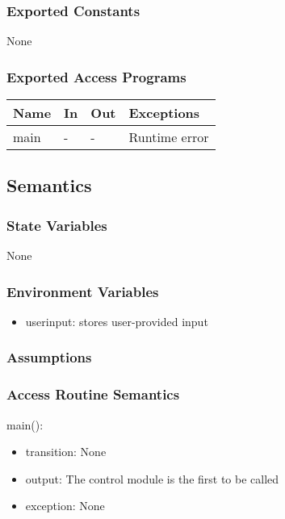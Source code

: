 \documentclass[12pt, titlepage]{article}
\begin{document}
\subsubsection{Exported Constants}
None

\subsubsection{Exported Access Programs}

\begin{center}
\begin{tabular}{p{2cm} p{4cm} p{4cm} p{2cm}}
\hline
\textbf{Name} & \textbf{In} & \textbf{Out} & \textbf{Exceptions} \\
\hline
main& - & - & Runtime error \\
\hline
\end{tabular}
\end{center}

\subsection{Semantics}

\subsubsection{State Variables}
None

\subsubsection{Environment Variables}
\begin{itemize}
  \item user\textunderscore input: stores user-provided input
\end{itemize}

\subsubsection{Assumptions}

  
\subsubsection{Access Routine Semantics}

\noindent main():
\begin{itemize}
\item transition: None 
\item output: The control module is the first to be called 
\item exception: None
\end{itemize}
\end{document}
